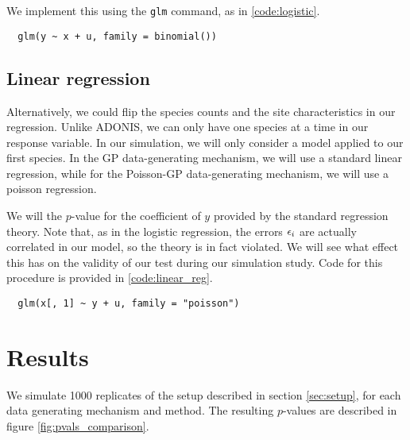 \documentclass{article}
\newenvironment{code}{\captionsetup{type=listing}}{}
\begin{document}
We implement this using the \texttt{glm} command, as in \ref{code:logistic}.

\begin{code}
\begin{verbatim}
  glm(y ~ x + u, family = binomial())
\end{verbatim}
\label{code:logistic}
\end{code}

\subsection{Linear regression}
\label{subsec:linear_regression}

Alternatively, we could flip the species counts and the site characteristics in
our regression. Unlike ADONIS, we can only have one species at a time in our
response variable. In our simulation, we will only consider a model applied to
our first species. In the GP data-generating mechanism, we will use a standard
linear regression, while for the Poisson-GP data-generating mechanism, we will
use a poisson regression.

We will the $p$-value for the coefficient of $y$ provided by the standard
regression theory. Note that, as in the logistic regression, the errors
$\epsilon_{i}$ are actually correlated in our model, so the theory is in fact
violated. We will see what effect this has on the validity of our test during
our simulation study. Code for this procedure is provided in
\ref{code:linear_reg}.

\begin{code}
\begin{verbatim}
  glm(x[, 1] ~ y + u, family = "poisson")
\end{verbatim}
\label{code:linear_reg}
\end{code}

\section{Results}
\label{sec:results}

We simulate 1000 replicates of the setup described in section \ref{sec:setup},
for each data generating mechanism and method. The resulting $p$-values are
described in figure \ref{fig:pvals_comparison}. 
\end{document}
